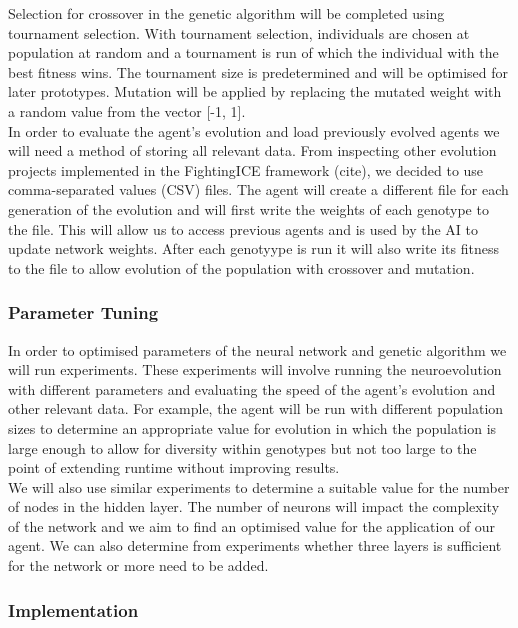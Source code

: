 \documentclass[12pt,a4paper]{article}
\begin{document}
Selection for crossover in the genetic algorithm will be completed using tournament selection. With tournament selection, individuals are chosen at population at random and a tournament is run of which the individual with the best fitness wins. The tournament size is predetermined and will be optimised for later prototypes. Mutation will be applied by replacing the mutated weight with a random value from the vector [-1, 1]. \\

In order to evaluate the agent's evolution and load previously evolved agents we will need a method of storing all relevant data. From inspecting other evolution projects implemented in the FightingICE framework (cite), we decided to use comma-separated values (CSV) files. The agent will create a different file for each generation of the evolution and will first write the weights of each genotype to the file. This will allow us to access previous agents and is used by the AI to update network weights. After each genotyype is run it will also write its fitness to the file to allow evolution of the population with crossover and mutation.

\subsubsection*{Parameter Tuning}

In order to optimised parameters of the neural network and genetic algorithm we will run experiments. These experiments will involve running the neuroevolution with different parameters and evaluating the speed of the agent's evolution and other relevant data. For example, the agent will be run with different population sizes to determine an appropriate value for evolution in which the population is large enough to allow for diversity within genotypes but not too large to the point of extending runtime without improving results.\\

We will also use similar experiments to determine a suitable value for the number of nodes in the hidden layer. The number of neurons will impact the complexity of the network and we aim to find an optimised value for the application of our agent. We can also determine from experiments whether three layers is sufficient for the network or more need to be added. 
\newpage
\subsubsection{Implementation}
\end{document}

